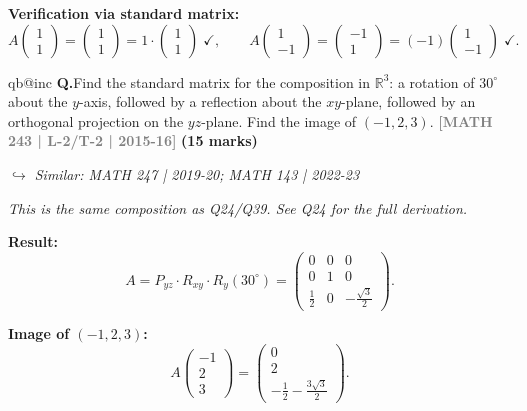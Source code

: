\documentclass[12pt,a3paper]{article}
\makeatletter
\newcommand{\yr}[1]{\hfill\textcolor{gray}{\small\textbf{[#1]}}}
\newcommand{\mk}[1]{\textcolor{orange!70!black}{\small\textbf{(#1 marks)}}}
\newcommand{\variant}[1]{\par\vspace{1pt}\textcolor{blue!50!black}%
  {\footnotesize\textit{$\hookrightarrow$ Similar: #1}}}
\newcounter{qnum}
\newcommand{\Q}[1]{%
  \csname qb@inc\endcsname
  \needspace{4\baselineskip}
  \refstepcounter{qnum}
  \vspace{6pt}
  \noindent\textbf{Q\theqnum.}\enspace #1\par
}
\makeatother
\begin{document}
\begin{tcolorbox}
\textbf{Verification via standard matrix:}
\[
A\begin{pmatrix}1\\1\end{pmatrix}=\begin{pmatrix}1\\1\end{pmatrix}=1\cdot\begin{pmatrix}1\\1\end{pmatrix}\;\checkmark,\qquad
A\begin{pmatrix}1\\-1\end{pmatrix}=\begin{pmatrix}-1\\1\end{pmatrix}=(-1)\begin{pmatrix}1\\-1\end{pmatrix}\;\checkmark.
\]

\end{tcolorbox}

\Q{Find the standard matrix for the composition in $\mathbb{R}^3$: a rotation of $30^\circ$ about the $y$-axis, followed by a reflection about the $xy$-plane, followed by an orthogonal projection on the $yz$-plane. Find the image of $(-1,2,3)$.
\yr{MATH 243 | L-2/T-2 | 2015-16} \mk{15}
\variant{MATH 247 | 2019-20; MATH 143 | 2022-23}}

\begin{tcolorbox}[enhanced,breakable,
  colback=cF!4,colframe=cF,boxrule=0.8pt,arc=5pt,
  title={\textbf{Answer --- Composition: Rot$(30^\circ,y)$ $\to$ Reflect$(xy)$ $\to$ Project$(yz)$; Image of $(-1,2,3)$}},
  fonttitle=\bfseries\color{white},colbacktitle=cF]

\textit{This is the same composition as Q24/Q39. See Q24 for the full derivation.}

\textbf{Result:}
\[
A = P_{yz}\cdot R_{xy}\cdot R_y(30^\circ)=\begin{pmatrix}0&0&0\\0&1&0\\\frac{1}{2}&0&-\frac{\sqrt{3}}{2}\end{pmatrix}.
\]

\textbf{Image of $(-1,2,3)$:}
\[
A\begin{pmatrix}-1\\2\\3\end{pmatrix}=\begin{pmatrix}0\\2\\-\frac{1}{2}-\frac{3\sqrt{3}}{2}\end{pmatrix}.
\]

\end{tcolorbox}
\end{document}
